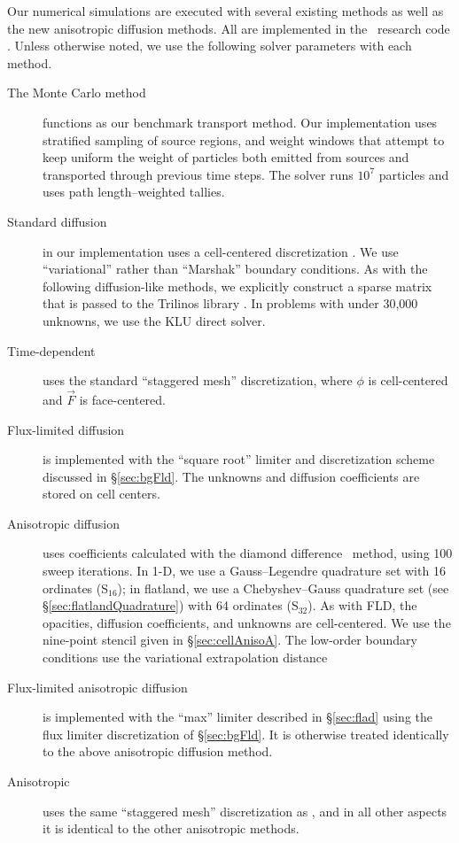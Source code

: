 Our numerical simulations are executed with several existing methods as well
as the new anisotropic diffusion methods. All
are implemented in the \pytrt\ research code \cite{Pytrt}. Unless otherwise
noted, we use the following solver parameters with each method.
\begin{description}
  \item[The Monte Carlo method] functions as our benchmark transport method. Our
    implementation uses stratified sampling of source regions, and weight
    windows that attempt to keep uniform the weight of particles both emitted
    from sources and transported through previous time steps. The solver runs
    $10^7$ particles and uses path length--weighted tallies.

  \item[Standard diffusion] in our implementation uses a cell-centered
    discretization \cite{Dud1976}.  We use ``variational'' rather than
    ``Marshak'' boundary conditions.
    As with the following diffusion-like methods, we explicitly
    construct a sparse matrix that is passed to the Trilinos library
    \cite{Her2003}.  In problems with under 30,000 unknowns, we use the KLU
    direct solver. 

  \item[Time-dependent \Pone] uses the standard ``staggered mesh''
    discretization, where $\phi$ is cell-centered and $\vec{F}$ is
    face-centered.

  \item[Flux-limited diffusion] is implemented with the ``square root'' limiter
    and discretization scheme discussed in \S\ref{sec:bgFld}. The unknowns and
    diffusion coefficients are stored on cell centers.

  \item[Anisotropic diffusion] uses
    coefficients calculated with the diamond difference \SN\ method, using 100
    sweep iterations. In 1-D, we use a Gauss--Legendre quadrature set with 16
    ordinates (S$_{16}$); in flatland, we use a Chebyshev--Gauss quadrature set
    (see \S\ref{sec:flatlandQuadrature}) with 64 ordinates (S$_{32}$). As
    with FLD, the opacities, diffusion coefficients, and unknowns are
    cell-centered. We use the nine-point stencil given in
    \S\ref{sec:cellAnisoA}. The low-order boundary conditions use the
    variational extrapolation distance 

  \item[Flux-limited anisotropic diffusion] is implemented with the
    ``max'' limiter described in \S\ref{sec:flad} using the flux limiter
    discretization of \S\ref{sec:bgFld}. It is otherwise treated identically to
    the above anisotropic diffusion method.

  \item[Anisotropic \Pone] uses the same ``staggered mesh'' discretization
    as \Pone, and in all other aspects it is identical to the other anisotropic
    methods.

\end{description}

